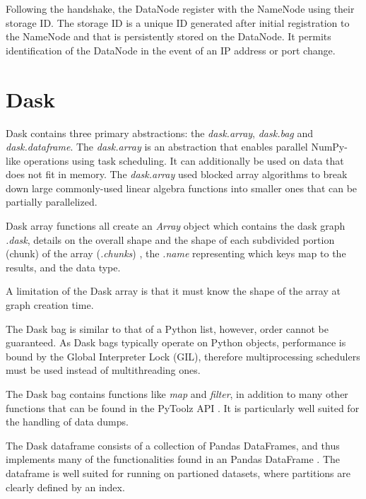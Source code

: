 \documentclass{report}
\begin{document}
        Following the handshake, the DataNode register with the NameNode using
        their storage ID. The storage ID is a unique ID generated after initial
        registration to the NameNode and that is persistently stored on the
        DataNode. It permits identification of the DataNode in the event of an
        IP address or port change. 
        
        \section{Dask}
        Dask contains three primary abstractions: the \textit{dask.array}, 
        \textit{dask.bag} and \textit{dask.dataframe}. The \textit{dask.array} 
        is an abstraction that enables parallel NumPy-like operations using task
        scheduling. It can additionally be used on data that does not fit in 
        memory. The \textit{dask.array} used blocked array algorithms to break 
        down large commonly-used linear algebra functions into smaller ones that
        can be partially parallelized.

        Dask array functions all create an \textit{Array} object which contains 
        the dask graph \textit{.dask}, details on the overall shape and the 
        shape of each subdivided portion (chunk) of the array (\textit{.chunks})
        , the \textit{.name} representing which keys map to the results, and the
        data type.

        A limitation of the Dask array is that it must know the shape of the 
        array at graph creation time.

        The Dask bag is similar to that of a Python list, however, order cannot 
        be guaranteed. As Dask bags typically operate on Python objects, 
        performance is bound by the Global Interpreter Lock (GIL), therefore 
        multiprocessing schedulers must be used instead of multithreading ones.

        The Dask bag contains functions like \textit{map} and \textit{filter}, 
        in addition to many other functions that can be found in the PyToolz API
        . It is particularly well suited for the handling of data dumps.

        The Dask dataframe consists of a collection of Pandas DataFrames, and 
        thus implements many of the functionalities found in an Pandas DataFrame
        . The dataframe is well suited for running on partioned datasets, where 
        partitions are clearly defined by an index.
\end{document}
